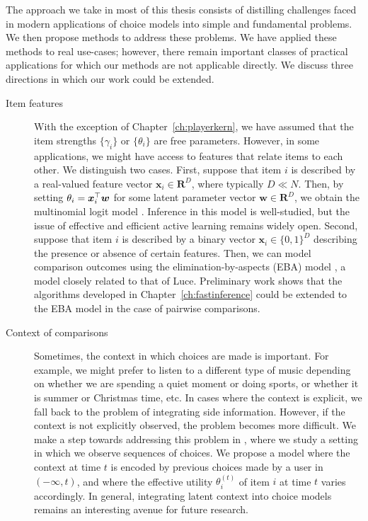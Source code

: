 The approach we take in most of this thesis consists of distilling challenges faced in modern applications of choice models into simple and fundamental problems.
We then propose methods to address these problems.
We have applied these methods to real use-cases; however, there remain important classes of practical applications for which our methods are not applicable directly.
We discuss three directions in which our work could be extended.

\begin{description}
\item[Item features] With the exception of Chapter~\ref{ch:playerkern}, we have assumed that the item strengths $\{ \gamma_i \}$ or $\{ \theta_i \}$ are free parameters.
However, in some applications, we might have access to features that relate items to each other.
We distinguish two cases.
First, suppose that item $i$ is described by a real-valued feature vector $\bm{x}_i \in \mathbf{R}^D$, where typically $D \ll N$.
Then, by setting $\theta_i = \bm{x}_i^\top \bm{w}$ for some latent parameter vector $\bm{w} \in \mathbf{R}^D$, we obtain the multinomial logit model \citep{mcfadden1973conditional, train2009discrete}.
Inference in this model is well-studied, but the issue of effective and efficient active learning remains widely open.
Second, suppose that item $i$ is described by a binary vector $\bm{x}_i \in \{0, 1\}^D$ describing the presence or absence of certain features.
Then, we can model comparison outcomes using the elimination-by-aspects (EBA) model \citep{tversky1972elimination}, a model closely related to that of Luce.
Preliminary work shows that the algorithms developed in Chapter~\ref{ch:fastinference} could be extended to the EBA model in the case of pairwise comparisons.

\item[Context of comparisons] Sometimes, the context in which choices are made is important.
For example, we might prefer to listen to a different type of music depending on whether we are spending a quiet moment or doing sports, or whether it is summer or Christmas time, etc.
In cases where the context is explicit, we fall back to the problem of integrating side information.
However, if the context is not explicitly observed, the problem becomes more difficult.
We make a step towards addressing this problem in \citet{ko2016collaborative}, where we study a setting in which we observe sequences of choices.
We propose a model where the context at time $t$ is encoded by previous choices made by a user in $(-\infty, t)$, and where the effective utility $\theta_i^{(t)}$ of item $i$ at time $t$ varies accordingly.
In general, integrating latent context into choice models remains an interesting avenue for future research.


\end{description}

